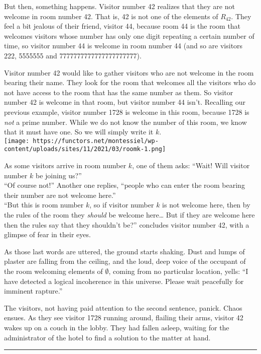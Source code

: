 \documentclass[
]{article}
\begin{document}
But then, something happens. Visitor number 42 realizes that they are
not welcome in room number 42. That is, 42 is not one of the elements of
\(R_{42}\). They feel a bit jealous of their friend, visitor 44, because
room 44 is the room that welcomes visitors whose number has only one
digit repeating a certain number of time, so visitor number 44 is
welcome in room number 44 (and so are visitors 222, 5555555 and
7777777777777777777777).

Visitor number 42 would like to gather visitors who are not welcome in
the room bearing their name. They look for the room that welcomes all
the visitors who do not have access to the room that has the same number
as them. So visitor number 42 is welcome in that room, but visitor
number 44 isn't. Recalling our previous example, visitor number 1728 is
welcome in this room, because 1728 is \emph{not} a prime number. While
we do not know the number of this room, we know that it must have one.
So we will simply write it \(k\).\\
\texttt{[image: https://functors.net/montessiel/wp-content/uploads/sites/11/2021/03/roomk-1.png]}

As some visitors arrive in room number \(k\), one of them asks: ``Wait!
Will visitor number \(k\) be joining us?''\\
``Of course not!'' Another one replies, ``people who can enter the room
bearing their number are not welcome here.''\\
``But this is room number \(k\), so if visitor number \(k\) is not
welcome here, then by the rules of the room they \emph{should} be
welcome here\ldots{} But if they are welcome here then the rules say
that they shouldn't be?'' concludes visitor number 42, with a glimpse of
fear in their eyes.

As those last words are uttered, the ground starts shaking. Dust and
lumps of plaster are falling from the ceiling, and the loud, deep voice
of the occupant of the room welcoming elements of \(\emptyset\), coming
from no particular location, yells: ``I have detected a logical
incoherence in this universe. Please wait peacefully for imminent
rapture.''

The visitors, not having paid attention to the second sentence, panick.
Chaos ensues. As they see visitor 1728 running around, flailing their
arms, visitor 42 wakes up on a couch in the lobby. They had fallen
asleep, waiting for the administrator of the hotel to find a solution to
the matter at hand.

\begin{center}\rule{0.5\linewidth}{0.5pt}\end{center}
\end{document}
